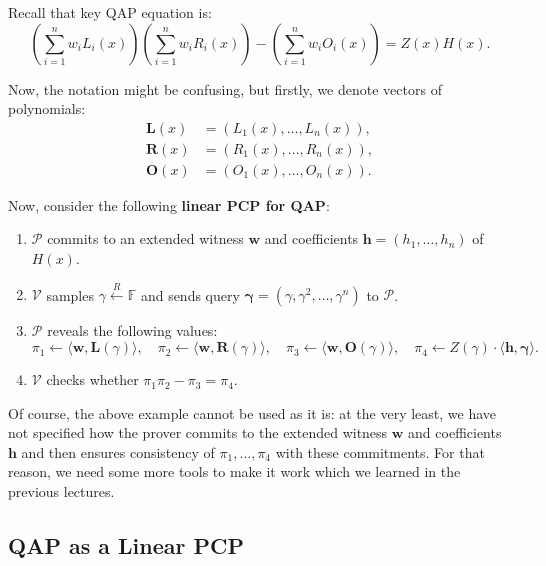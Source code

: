 \documentclass[../lecture-notes.tex]{subfiles}
\begin{document}
\begin{example}
    Recall that key QAP equation is:
    \begin{equation*}
        \left(\sum_{i=1}^nw_iL_i(x)\right)\left(\sum_{i=1}^nw_iR_i(x)\right) - \left(\sum_{i=1}^nw_iO_i(x)\right) = Z(x)H(x).
    \end{equation*}

    Now, the notation might be confusing, but firstly, we denote vectors of polynomials: 
    \begin{align*}
        \boldsymbol{L}(x) & = (L_1(x),\dots,L_n(x)), \\
        \boldsymbol{R}(x) & = (R_1(x),\dots,R_n(x)), \\
        \boldsymbol{O}(x) & = (O_1(x),\dots,O_n(x)).
    \end{align*}
    
    Now, consider the following \textbf{linear PCP for QAP}:
    \begin{enumerate}
        \item $\mathcal{P}$ commits to an extended witness $\mathbf{w}$ and coefficients $\mathbf{h} = (h_1,\dots,h_n)$ of $H(x)$.
        \item $\mathcal{V}$ samples $\gamma \xleftarrow{R} \mathbb{F}$ and sends query $\boldsymbol{\gamma} = (\gamma,\gamma^2,\dots,\gamma^n)$ to $\mathcal{P}$.
        \item $\mathcal{P}$ reveals the following values:
        \begin{equation*}
            \pi_1 \gets \langle \mathbf{w}, \boldsymbol{L}(\gamma) \rangle, \quad \pi_2 \gets \langle \mathbf{w}, \boldsymbol{R}(\gamma) \rangle, \quad \pi_3 \gets \langle \mathbf{w}, \boldsymbol{O}(\gamma) \rangle, \quad \pi_4 \gets Z(\gamma) \cdot \langle \mathbf{h}, \boldsymbol{\gamma} \rangle.
        \end{equation*}
        \item $\mathcal{V}$ checks whether $\pi_1\pi_2 - \pi_3 = \pi_4$.
    \end{enumerate}
\end{example}

Of course, the above example cannot be used as it is: at the very least, we have not specified how the prover commits to the extended witness $\mathbf{w}$ and coefficients $\mathbf{h}$ and then ensures consistency of $\pi_1,\dots,\pi_4$ with these commitments. For that reason, we need some more tools to make it work which we learned in the previous lectures.

\subsection{QAP as a Linear PCP}
\end{document}
